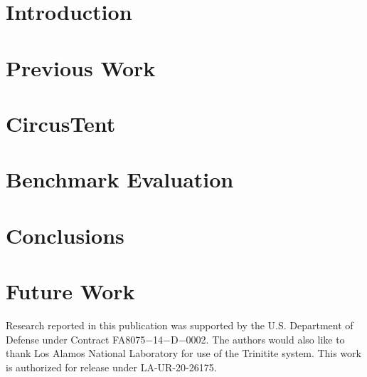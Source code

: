 \documentclass[sigconf]{acmart}
\begin{document}


\maketitle

\section{Introduction}
\label{sec:introduction}


\section{Previous Work}
\label{sec:previous_work}


\section{CircusTent}
\label{sec:circustent}


\section{Benchmark Evaluation}
\label{sec:benchmark_evaluation}


\section{Conclusions}
\label{sec:conclusions}


\section{Future Work}
\label{sec:future_work}


\begin{acks}
Research reported in this publication was supported by the U.S. Department of Defense under Contract FA8075$-$14$-$D$-$0002.
The authors would also like to thank Los Alamos National Laboratory for use of the Trinitite system.
This work is authorized for release under LA-UR-20-26175.
\end{acks}




\end{document}
